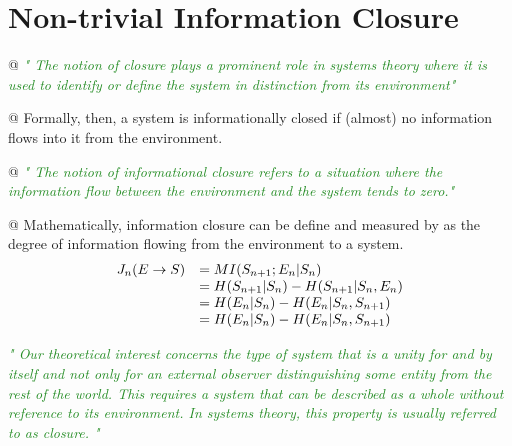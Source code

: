 \documentclass[utf8]{article}
\makeatletter
\newenvironment{ants}
			{
			 \begin{easylist}[itemize]
			}
			{
			\end{easylist}
			}
\newcommand{\rewrite}[1]{\textcolor{ForestGreen}{\textit{"#1"}}\newline}
\newcommand{\martin}[1]{\todo[color=SpringGreen]{@Martin:\\#1}}
\makeatother
\begin{document}
	\section{\martin{todo}Non-trivial Information Closure}
		\begin{ants}
			
			@ \rewrite{
				The notion of closure plays a prominent role in systems theory where it is used to identify or deﬁne the system in distinction from its environment} \cite{BERTSCHINGER.2006}
			
			
			@ Formally, then, a system is informationally closed if (almost) no information flows into it from the environment.
			
			@ \rewrite{
				The notion of informational closure refers to a situation where the information flow between the environment and the system tends to zero.} \cite{BERTSCHINGER.2006}
			
			@ Mathematically, information closure can be define and measured by as the degree of information flowing from the environment to a system.
				\begin{equation}
					\left.\begin{array} { r l } { J _ { n } ( E \rightarrow S ) } & { = M I ( S _ { n + 1} ; E _ { n } | S _ { n } ) } \\ { } & { = H ( S _ { n + 1} | S _ { n } ) - H ( S _ { n + 1} | S _ { n } ,E _ { n } ) } \\ { } & { = H ( E _ { n } | S _ { n } ) - H ( E _ { n } | S _ { n } ,S _ { n + 1} ) } \\ { } & { = H ( E _ { n } | S _ { n } ) - H ( E _ { n } | S _ { n } ,S _ { n + 1} ) } \end{array} \right.
				\end{equation}

		\end{ants}
		
		
		
		
		\rewrite{
			Our theoretical interest concerns the type of system that is a unity for and by itself and not only for an external observer distinguishing some entity from the rest of the world. This requires a system that can be described as a whole without reference to its environment. In systems theory, this property is usually referred to as closure.
		}\citep{BERTSCHINGER.2006}
		
\end{document}
